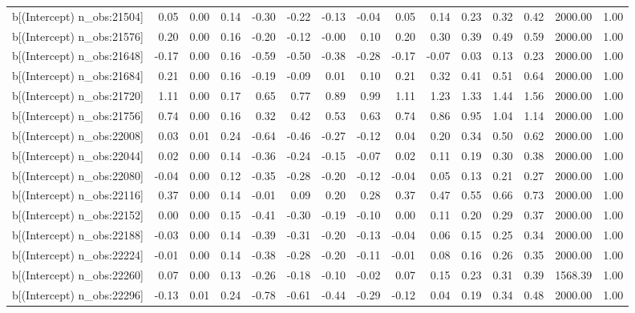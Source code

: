 \begin{table}[ht]
\begin{tabular}{rrrrrrrrrrrrrrr}
  b[(Intercept) n\_obs:21504] & 0.05 & 0.00 & 0.14 & -0.30 & -0.22 & -0.13 & -0.04 & 0.05 & 0.14 & 0.23 & 0.32 & 0.42 & 2000.00 & 1.00 \\ 
  b[(Intercept) n\_obs:21576] & 0.20 & 0.00 & 0.16 & -0.20 & -0.12 & -0.00 & 0.10 & 0.20 & 0.30 & 0.39 & 0.49 & 0.59 & 2000.00 & 1.00 \\ 
  b[(Intercept) n\_obs:21648] & -0.17 & 0.00 & 0.16 & -0.59 & -0.50 & -0.38 & -0.28 & -0.17 & -0.07 & 0.03 & 0.13 & 0.23 & 2000.00 & 1.00 \\ 
  b[(Intercept) n\_obs:21684] & 0.21 & 0.00 & 0.16 & -0.19 & -0.09 & 0.01 & 0.10 & 0.21 & 0.32 & 0.41 & 0.51 & 0.64 & 2000.00 & 1.00 \\ 
  b[(Intercept) n\_obs:21720] & 1.11 & 0.00 & 0.17 & 0.65 & 0.77 & 0.89 & 0.99 & 1.11 & 1.23 & 1.33 & 1.44 & 1.56 & 2000.00 & 1.00 \\ 
  b[(Intercept) n\_obs:21756] & 0.74 & 0.00 & 0.16 & 0.32 & 0.42 & 0.53 & 0.63 & 0.74 & 0.86 & 0.95 & 1.04 & 1.14 & 2000.00 & 1.00 \\ 
  b[(Intercept) n\_obs:22008] & 0.03 & 0.01 & 0.24 & -0.64 & -0.46 & -0.27 & -0.12 & 0.04 & 0.20 & 0.34 & 0.50 & 0.62 & 2000.00 & 1.00 \\ 
  b[(Intercept) n\_obs:22044] & 0.02 & 0.00 & 0.14 & -0.36 & -0.24 & -0.15 & -0.07 & 0.02 & 0.11 & 0.19 & 0.30 & 0.38 & 2000.00 & 1.00 \\ 
  b[(Intercept) n\_obs:22080] & -0.04 & 0.00 & 0.12 & -0.35 & -0.28 & -0.20 & -0.12 & -0.04 & 0.05 & 0.13 & 0.21 & 0.27 & 2000.00 & 1.00 \\ 
  b[(Intercept) n\_obs:22116] & 0.37 & 0.00 & 0.14 & -0.01 & 0.09 & 0.20 & 0.28 & 0.37 & 0.47 & 0.55 & 0.66 & 0.73 & 2000.00 & 1.00 \\ 
  b[(Intercept) n\_obs:22152] & 0.00 & 0.00 & 0.15 & -0.41 & -0.30 & -0.19 & -0.10 & 0.00 & 0.11 & 0.20 & 0.29 & 0.37 & 2000.00 & 1.00 \\ 
  b[(Intercept) n\_obs:22188] & -0.03 & 0.00 & 0.14 & -0.39 & -0.31 & -0.20 & -0.13 & -0.04 & 0.06 & 0.15 & 0.25 & 0.34 & 2000.00 & 1.00 \\ 
  b[(Intercept) n\_obs:22224] & -0.01 & 0.00 & 0.14 & -0.38 & -0.28 & -0.20 & -0.11 & -0.01 & 0.08 & 0.16 & 0.26 & 0.35 & 2000.00 & 1.00 \\ 
  b[(Intercept) n\_obs:22260] & 0.07 & 0.00 & 0.13 & -0.26 & -0.18 & -0.10 & -0.02 & 0.07 & 0.15 & 0.23 & 0.31 & 0.39 & 1568.39 & 1.00 \\ 
  b[(Intercept) n\_obs:22296] & -0.13 & 0.01 & 0.24 & -0.78 & -0.61 & -0.44 & -0.29 & -0.12 & 0.04 & 0.19 & 0.34 & 0.48 & 2000.00 & 1.00 \\ 

\end{tabular}
\end{table}
